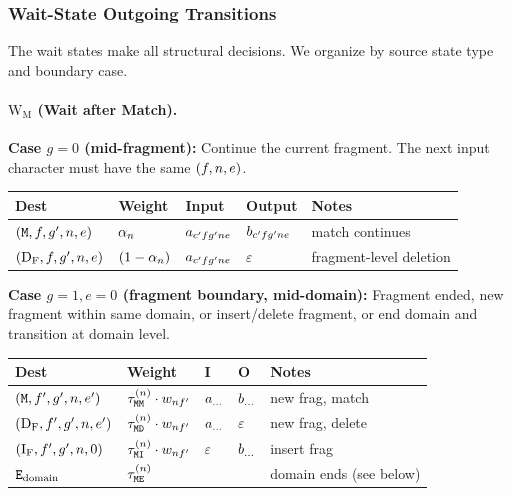 \subsubsection{Wait-State Outgoing Transitions}
\label{sec:wait-outgoing}

The wait states make all structural decisions.
We organize by source state type and boundary case.

\paragraph{$\mathrm{W_M}$ (Wait after Match).}

\bigskip
\noindent\textbf{Case $g=0$ (mid-fragment):}
Continue the current fragment. The next input character must have the same $(f, n, e)$.

\begin{center}
\renewcommand{\arraystretch}{1.4}
\begin{tabular}{lllll}
\hline
Dest & Weight & Input & Output & Notes \\
\hline
$({\tt M}, f, g', n, e)$ &
  $\alpha_n$ &
  $a_{c'f g'n e}$ &
  $b_{c'f g'n e}$ &
  match continues \\
$(\mathrm{D_F}, f, g', n, e)$ &
  $(1-\alpha_n)$ &
  $a_{c'f g'n e}$ &
  $\varepsilon$ &
  fragment-level deletion \\
\hline
\end{tabular}
\end{center}

\noindent\textbf{Case $g=1, e=0$ (fragment boundary, mid-domain):}
Fragment ended, new fragment within same domain, or insert/delete fragment,
or end domain and transition at domain level.

\begin{center}
\renewcommand{\arraystretch}{1.4}
\begin{tabular}{lllll}
\hline
Dest & Weight & I & O & Notes \\
\hline
$({\tt M}, f', g', n, e')$ &
  $\tau^{(n)}_{{\tt M}{\tt M}} \cdot w_{nf'}$ &
  $a_{\ldots}$ &
  $b_{\ldots}$ &
  new frag, match \\
$(\mathrm{D_F}, f', g', n, e')$ &
  $\tau^{(n)}_{{\tt M}{\tt D}} \cdot w_{nf'}$ &
  $a_{\ldots}$ &
  $\varepsilon$ &
  new frag, delete \\
$(\mathrm{I_F}, f', g', n, 0)$ &
  $\tau^{(n)}_{{\tt M}{\tt I}} \cdot w_{nf'}$ &
  $\varepsilon$ &
  $b_{\ldots}$ &
  insert frag \\
${\tt E}_{\rm domain}$ &
  $\tau^{(n)}_{{\tt M}{\tt E}}$ &
  &
  &
  domain ends (see below) \\
\hline
\end{tabular}
\end{center}


